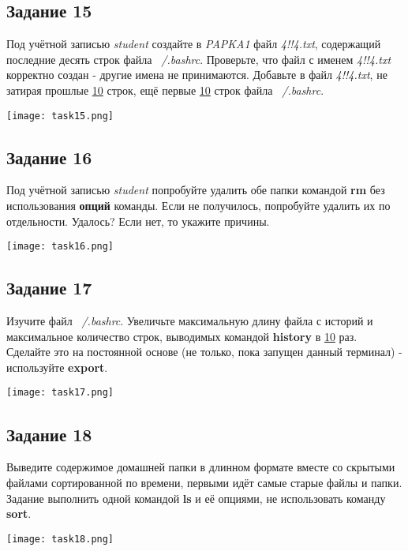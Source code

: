 \documentclass[12pt, a4paper]{report}
\begin{document}
			\subsection*{Задание 15}
			Под учётной записью \textit{student} создайте в \textit{PAPKA1} файл \textit{4!!4.txt}, содержащий последние десять строк файла \textit{~/.bashrc}. Проверьте, что файл с именем \textit{4!!4.txt} корректно создан - другие имена не принимаются. Добавьте в файл \textit{4!!4.txt}, не затирая прошлые \underline{10} строк, ещё первые \underline{10} строк файла \textit{~/.bashrc}.
			\lstset{style=mystyle}
			
			\begin{center}
				\texttt{[image: task15.png]}
			\end{center}

			\subsection*{Задание 16}
			Под учётной записью \textit{student} попробуйте удалить обе папки командой \textbf{rm} без использования \textbf{опций} команды. Если не получилось, попробуйте удалить их по отдельности. Удалось? Если нет, то укажите причины.
			\lstset{style=mystyle}
			
			\begin{center}
				\texttt{[image: task16.png]}
			\end{center}

			\subsection*{Задание 17}
			Изучите файл \textit{~/.bashrc}. Увеличьте максимальную длину файла с историй и максимальное количество строк, выводимых командой \textbf{history} в \underline{10} раз. Сделайте это на постоянной основе (не только, пока запущен данный терминал) - используйте \textbf{export}.
			\lstset{style=mystyle}
			
			\begin{center}
				\texttt{[image: task17.png]}
			\end{center}

			\subsection*{Задание 18}
			Выведите содержимое домашней папки в длинном формате вместе со скрытыми файлами сортированной по времени, первыми идёт самые старые файлы и папки. Задание выполнить одной командой \textbf{ls} и её опциями, не использовать команду \textbf{sort}.
			\lstset{style=mystyle}
			
			\begin{center}
				\texttt{[image: task18.png]}
			\end{center}
\end{document}
